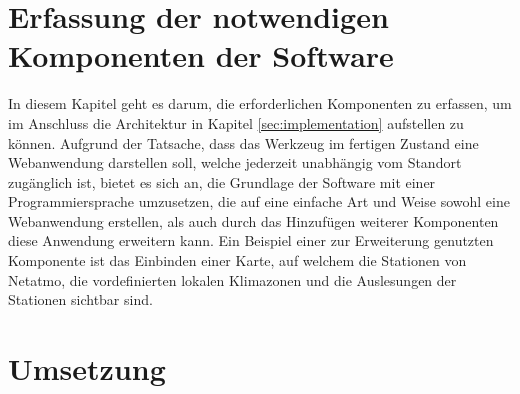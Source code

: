 \section{Erfassung der notwendigen Komponenten der Software}
In diesem Kapitel geht es darum, die erforderlichen Komponenten zu erfassen, um im Anschluss die Architektur in Kapitel \ref{sec:implementation} aufstellen zu können. Aufgrund der Tatsache, dass das Werkzeug im fertigen Zustand eine Webanwendung darstellen soll, welche jederzeit unabhängig vom Standort zugänglich ist, bietet es sich an, die Grundlage der Software mit einer Programmiersprache 
umzusetzen, die auf eine einfache Art und Weise sowohl eine Webanwendung erstellen, als auch durch das Hinzufügen weiterer Komponenten diese Anwendung erweitern kann. Ein Beispiel einer zur Erweiterung genutzten Komponente ist das Einbinden einer Karte, auf welchem die Stationen von Netatmo, die vordefinierten lokalen Klimazonen und die Auslesungen der Stationen sichtbar sind.

\section{Umsetzung}
